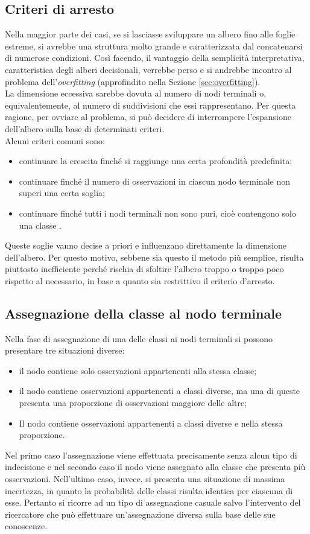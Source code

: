 \subsection{Criteri di arresto}
Nella maggior parte dei casi, se si lasciasse sviluppare un albero fino alle foglie estreme, si avrebbe una struttura molto grande e caratterizzata dal concatenarsi di numerose condizioni. Così facendo, il vantaggio della semplicità interpretativa, caratteristica degli alberi decisionali, verrebbe perso e si andrebbe incontro al problema dell'\textit{overfitting} (approfindito nella Sezione \ref{sec:overfitting}).\\
La dimensione eccessiva sarebbe dovuta al numero di nodi terminali o, equivalentemente, al numero di suddivisioni che essi rappresentano. Per questa ragione, per ovviare al problema, si può decidere di interrompere l’espansione dell’albero sulla base di determinati criteri.\\
Alcuni criteri comuni sono:
\begin{itemize}
    \item  continuare la crescita finché si raggiunge una certa profondità predefinita;
    \item continuare finché il numero di osservazioni in ciascun nodo terminale non superi una certa soglia;
    \item continuare finché tutti i nodi terminali non sono puri, cioè contengono solo una classe .
\end{itemize}

Queste soglie vanno decise a priori e influenzano direttamente la dimensione
dell’albero. Per questo motivo, sebbene sia questo il metodo più semplice,
risulta piuttosto inefficiente perché rischia di sfoltire l'albero troppo o troppo poco rispetto al necessario, in base a quanto sia restrittivo il criterio d’arresto.

\subsection{Assegnazione della classe al nodo terminale}
Nella fase di assegnazione di una delle classi ai nodi terminali si possono
presentare tre situazioni diverse:
\begin{itemize}
    \item il nodo contiene solo osservazioni appartenenti alla stessa classe;
    \item il nodo contiene osservazioni appartenenti a classi diverse, ma una di queste presenta una proporzione di osservazioni maggiore delle altre;
    \item Il nodo contiene osservazioni appartenenti a classi diverse e nella stessa proporzione.
\end{itemize}
Nel primo caso l’assegnazione viene effettuata precisamente senza alcun tipo di
indecisione e nel secondo caso il nodo viene assegnato alla classe che presenta più osservazioni. Nell'ultimo caso, invece, si presenta una situazione di massima incertezza, in quanto la probabilità delle classi risulta identica per ciascuna di esse. Pertanto si ricorre ad un tipo di assegnazione
casuale salvo l'intervento del ricercatore che può effettuare un’assegnazione diversa sulla base delle sue conoscenze.

